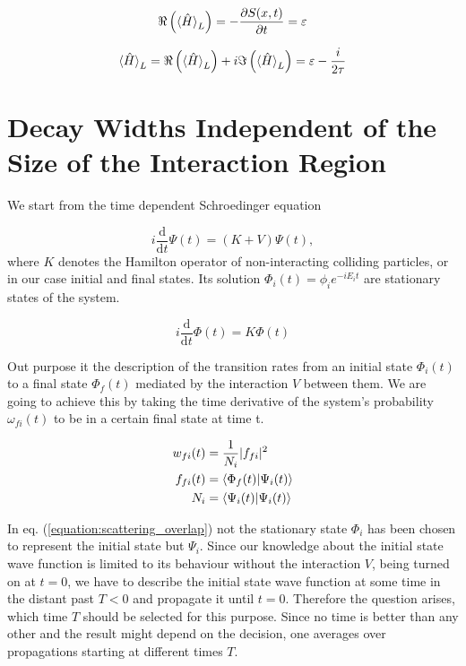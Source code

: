\begin{equation}
  \Re \left( \braket{\hat{H}}_L \right) = -\frac{\partial S(x,t)}{\partial t}
  = \varepsilon
\end{equation}


\begin{equation}
  \braket{\hat{H}}_L = \Re \left( \braket{\hat{H}}_L \right)
  + i \Im \left( \braket{\hat{H}}_L \right) = \varepsilon - \frac{i}{2\tau}
\end{equation}




\section{Decay Widths Independent of the Size of the Interaction Region}


We start from the time dependent Schroedinger equation

\begin{equation}
  i \frac{\mathrm{d}}{\mathrm{d}t} \Psi(t) = (K + V) \Psi(t) ,
\end{equation}
where $K$ denotes the Hamilton operator of non-interacting colliding
particles, or in our case initial and final states. Its solution
$\Phi_i(t) = \phi_i e^{-iE_it}$ are stationary states of the system.

\begin{equation}
  i \frac{\mathrm{d}}{\mathrm{d}t} \Phi(t) = K \Phi(t)
\end{equation}

Out purpose it the description of the transition rates from an initial state
$\Phi_i(t)$ to a final state $\Phi_f(t)$ mediated by the interaction $V$ between
them. We are going to achieve this by taking the time derivative of the system's
probability $\omega_{fi}(t)$ to be in a certain final state at time t.

\begin{align}
  w_{fi}(t) &= \frac 1{N_i} |f_{fi}|^2 \\
  f_{fi}(t) &= \braket{\Phi_f(t)|\Psi_i(t)} \label{equation:scattering_overlap}\\
  N_i       &= \braket{\Psi_i(t)|\Psi_i(t)}
\end{align}

In eq. (\ref{equation:scattering_overlap}) not the stationary state $\Phi_i$
has been chosen to represent the initial state but $\Psi_i$. Since our knowledge
about the initial state wave function is limited to its behaviour without the
interaction $V$, being turned on at $t=0$, we have to describe the initial state
wave function at some time in the distant past $T<0$ and propagate it until $t=0$.
Therefore the question arises, which time $T$ should be selected for this purpose.
Since no time is better than any other and the result might depend on the decision,
one averages over propagations starting at different times $T$.

